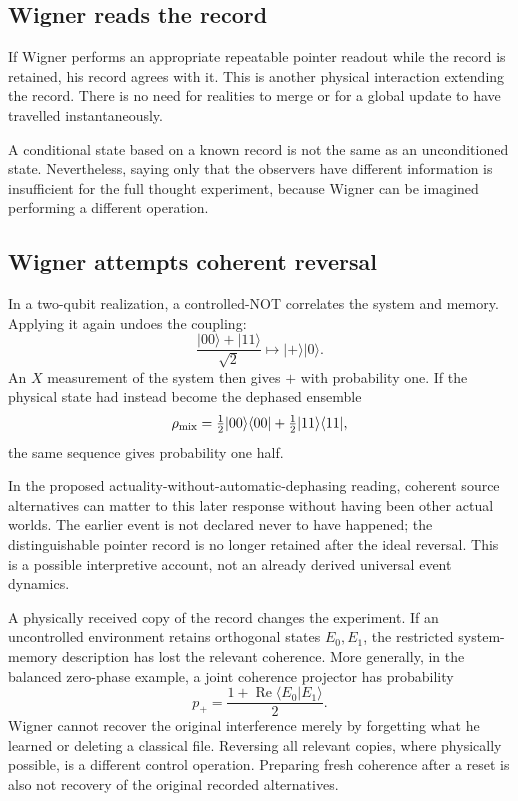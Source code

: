 \documentclass[11pt,a4paper]{article}
\newcommand{\ket}[1]{\lvert #1\rangle}
\newcommand{\bra}[1]{\langle #1\rvert}
\begin{document}
\subsection{Wigner reads the record}
If Wigner performs an appropriate repeatable pointer readout while the record is retained, his record agrees with it. This is another physical interaction extending the record. There is no need for realities to merge or for a global update to have travelled instantaneously.

A conditional state based on a known record is not the same as an unconditioned state. Nevertheless, saying only that the observers have different information is insufficient for the full thought experiment, because Wigner can be imagined performing a different operation.

\subsection{Wigner attempts coherent reversal}
In a two-qubit realization, a controlled-NOT correlates the system and memory. Applying it again undoes the coupling:
\begin{equation}
\frac{\ket{00}+\ket{11}}{\sqrt2}\longmapsto\ket{+}\ket0.
\end{equation}
An \(X\) measurement of the system then gives \(+\) with probability one. If the physical state had instead become the dephased ensemble
\begin{equation}
\rho_{\rm mix}=\tfrac12\ket{00}\bra{00}+
\tfrac12\ket{11}\bra{11},
\end{equation}
the same sequence gives probability one half.

In the proposed actuality-without-automatic-dephasing reading, coherent source alternatives can matter to this later response without having been other actual worlds. The earlier event is not declared never to have happened; the distinguishable pointer record is no longer retained after the ideal reversal. This is a possible interpretive account, not an already derived universal event dynamics.

A physically received copy of the record changes the experiment. If an uncontrolled environment retains orthogonal states \(E_0,E_1\), the restricted system-memory description has lost the relevant coherence. More generally, in the balanced zero-phase example, a joint coherence projector has probability
\begin{equation}
p_+=\frac{1+\operatorname{Re}\langle E_0|E_1\rangle}{2}.
\end{equation}
Wigner cannot recover the original interference merely by forgetting what he learned or deleting a classical file. Reversing all relevant copies, where physically possible, is a different control operation. Preparing fresh coherence after a reset is also not recovery of the original recorded alternatives.
\end{document}
